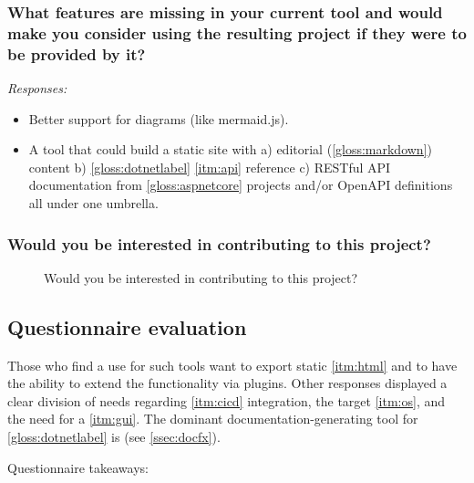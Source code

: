 \subsubsection*{What features are missing in your current tool and would make you consider using the resulting project if they were to be provided by it?}

\textit{Responses:}
\begin{itemize}
    \item Better support for diagrams (like mermaid.js).
    \item A tool that could build a static site with a) editorial (\ref{gloss:markdown}) content b) \ref{gloss:dotnetlabel} \ref{itm:api} reference c) RESTful API documentation from \ref{gloss:aspnetcore} projects and/or OpenAPI definitions all under one umbrella.
\end{itemize}

\subsubsection*{Would you be interested in contributing to this project?}

\begin{figure}[H]
    \centering
    \caption{Would you be interested in contributing to this project?}
\end{figure}

\subsection{Questionnaire evaluation} \label{ssec:questionnaireeval}

Those who find a use for such tools want to export static \ref{itm:html} and to have the ability to extend the functionality via plugins.
Other responses displayed a clear division of needs regarding \ref{itm:cicd} integration, the target \ref{itm:os}, and the need for a \ref{itm:gui}.
The dominant documentation-generating tool for \ref{gloss:dotnetlabel} is  (see \ref{ssec:docfx}).

Questionnaire takeaways:


